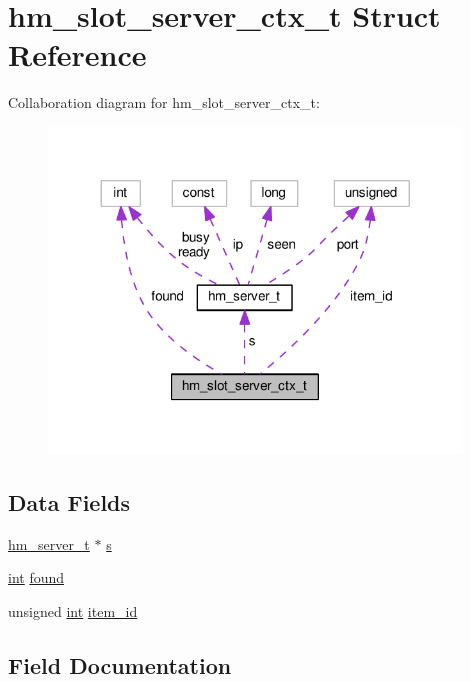 \hypertarget{structhm__slot__server__ctx__t}{}\section{hm\+\_\+slot\+\_\+server\+\_\+ctx\+\_\+t Struct Reference}
\label{structhm__slot__server__ctx__t}


Collaboration diagram for hm\+\_\+slot\+\_\+server\+\_\+ctx\+\_\+t\+:
\nopagebreak
\begin{figure}[H]
\begin{center}
\leavevmode
\includegraphics[width=311pt]{structhm__slot__server__ctx__t__coll__graph}
\end{center}
\end{figure}
\subsection*{Data Fields}
\begin{DoxyCompactItemize}
\item 
\hyperlink{structhm__server__t}{hm\+\_\+server\+\_\+t} $\ast$ \hyperlink{structhm__slot__server__ctx__t_ad3d0eb1204810463c38c678d93d12618}{s}
\item 
\hyperlink{pcre_8txt_a42dfa4ff673c82d8efe7144098fbc198}{int} \hyperlink{structhm__slot__server__ctx__t_a6766dc2be33ea8df718cf16c992150ca}{found}
\item 
unsigned \hyperlink{pcre_8txt_a42dfa4ff673c82d8efe7144098fbc198}{int} \hyperlink{structhm__slot__server__ctx__t_a778fe1ff6ffe8b45edaccf4aacd70baa}{item\+\_\+id}
\end{DoxyCompactItemize}


\subsection{Field Documentation}
